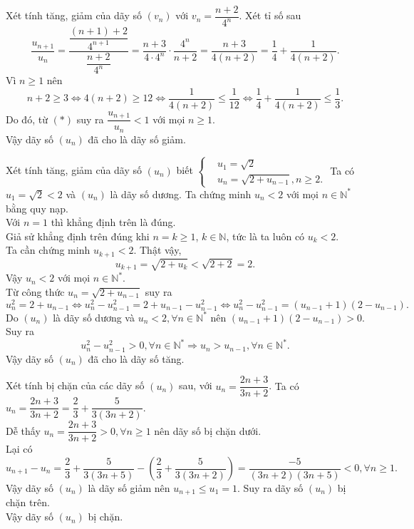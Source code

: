 \begin{bt}%
	Xét tính tăng, giảm của dãy số $(v_n)$ với $v_n=\dfrac{n+2}{4^n}$.
\loigiai
{
	Xét tỉ số sau
	\[\dfrac{u_{n+1}}{u_n} = \dfrac{\dfrac{(n+1)+2}{4^{n+1}}}{\dfrac{n+2}{4^n}} = \dfrac{n+3}{4\cdot 4^n}\cdot \dfrac{4^n}{n+2} = \dfrac{n+3}{4(n+2)} = \dfrac{1}{4}+\dfrac{1}{4(n+2)}.\tag{$*$}\]
	Vì $n \geq 1$ nên
	\[n+2 \geq 3 \Leftrightarrow 4(n+2)\geq 12 \Leftrightarrow \dfrac{1}{4(n+2)} \leq \dfrac{1}{12} \Leftrightarrow \dfrac{1}{4}+\dfrac{1}{4(n+2)}\leq \dfrac{1}{3}.\]
	Do đó, từ $(*)$ suy ra $\dfrac{u_{n+1}}{u_n}<1$ với mọi $n\geq 1$.\\
	Vậy dãy số $(u_n)$ đã cho là dãy số giảm.
}
\end{bt}

\begin{bt}%
	Xét tính tăng, giảm của dãy số $(u_n)$ biết $\left\{\begin{aligned}&u_1=\sqrt{2} \\&u_n=\sqrt{2+u_{n-1}}, n\geq 2.\end{aligned}\right.$
	\loigiai
	{
		Ta có $u_1=\sqrt{2}<2$ và $(u_n)$ là dãy số dương. Ta chứng minh $u_n<2$ với mọi $n\in \mathbb{N}^*$ bằng quy nạp.\\
		Với $n=1$ thì khẳng định trên là đúng.\\
		Giả sử khẳng định trên đúng khi $n=k\geq 1$, $k\in \mathbb{N}$, tức là ta luôn có $u_k<2$.\\
		Ta cần chứng minh $u_{k+1}<2$. Thật vậy,
		\[u_{k+1}=\sqrt{2+u_k}<\sqrt{2+2}=2.\]
		Vậy $u_n<2$ với mọi $n\in \mathbb{N}^*$.\\
		Từ công thức $u_n=\sqrt{2+u_{n-1}}$ suy ra
		\[u_n^2=2+u_{n-1} \Leftrightarrow u_n^2-u_{n-1}^2 = 2+u_{n-1}-u_{n-1}^2 \Leftrightarrow u_n^2-u_{n-1}^2 = (u_{n-1}+1)(2-u_{n-1}).\]
		Do $(u_n)$ là dãy số dương và $u_n<2, \forall n\in \mathbb{N}^*$ nên $(u_{n-1}+1)(2-u_{n-1})>0$. Suy ra
		\[u_n^2-u_{n-1}^2>0, \forall n\in \mathbb{N}^* \Rightarrow u_n>u_{n-1}, \forall n\in \mathbb{N}^*.\]
		Vậy dãy số $(u_n)$ đã cho là dãy số tăng.
	}
\end{bt}

\begin{bt}%
	Xét tính bị chặn của các dãy số $(u_n)$ sau, với $u_n=\dfrac{2n+3}{3n+2}$.
	\loigiai
	{
		Ta có $u_n=\dfrac{2n+3}{3n+2}=\dfrac{2}{3}+\dfrac{5}{3(3n+2)}$.\\
		Dễ thấy $u_n=\dfrac{2n+3}{3n+2}>0, \forall n \geq 1$ nên dãy số bị chặn dưới.\\
		Lại có
		\[u_{n+1}-u_n=\dfrac{2}{3}+\dfrac{5}{3(3n+5)}-\left( \dfrac{2}{3}+\dfrac{5}{3(3n+2)} \right)=\dfrac{-5}{(3n+2)(3n+5)}<0, \forall n \geq 1.\]
		Vậy dãy số $(u_n)$ là dãy số giảm nên $u_{n+1}\leq u_1=1$. Suy ra dãy số $(u_n)$ bị chặn trên.\\
		Vậy dãy số $(u_n)$ bị chặn.
	}
\end{bt}

